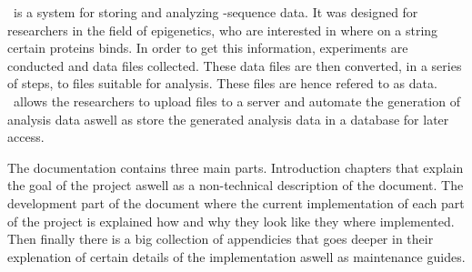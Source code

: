 \appName\ is a system for storing and analyzing -sequence data. It was designed for researchers in the field of epigenetics, who are interested in where on a  string certain proteins binds. In order to get this information, experiments are conducted and  data files collected. These data files are then converted, in a series of steps, to files suitable for analysis. These files are hence refered to as  data. \appName\ allows the researchers to upload  files to a server and automate the generation of analysis data aswell as store the generated analysis data in a database for later access. 

The documentation contains three main parts. Introduction chapters that explain the goal of the project aswell as a non-technical description of the document. The development part of the document where the current implementation of each part of the project is explained how and why they look like they where implemented. Then finally there is a big collection of appendicies that goes deeper in their explenation of certain details of the implementation aswell as maintenance guides.

